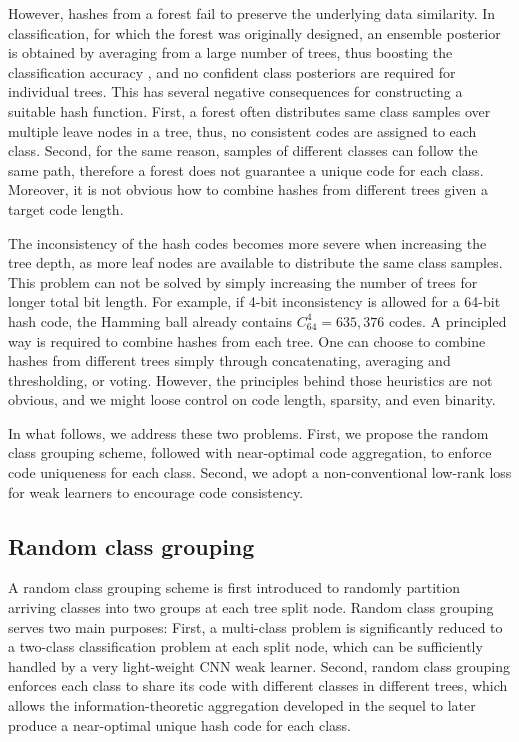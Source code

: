 \documentclass[runningheads]{llncs}
\begin{document}
However, hashes from a forest fail to preserve the underlying data similarity.
In classification, for which the forest was originally designed, an ensemble
posterior is obtained by averaging from a large number of trees, thus boosting
the classification accuracy \cite{RF2001}, and no confident class posteriors are
required for individual trees. This has several negative consequences for
constructing a suitable hash function. First, a forest often distributes same
class samples over multiple leave nodes in a tree, thus, no consistent codes are
assigned to each class. Second, for the same reason, samples of different
classes can follow the same path, therefore a forest does not guarantee a unique
code for each class. Moreover, it is not obvious how to combine hashes from
different trees given a target code length.

The inconsistency of the hash codes becomes more severe when increasing the tree
depth, as more leaf nodes are available to distribute the same class
samples. This problem can not be solved by simply increasing the number of trees
for longer total bit length. For example, if 4-bit inconsistency is allowed for
a 64-bit hash code, the Hamming ball already contains $ C_{64}^4= 635,376$
codes.  A principled way is required to combine hashes from each tree. One can
choose to combine hashes from different trees simply through concatenating,
averaging and thresholding, or voting. However, the principles behind those
heuristics are not obvious, and we might loose control on code length, sparsity,
and even binarity.

In what follows, we address these two problems. First, we propose the random class
grouping scheme, followed with near-optimal code aggregation, to enforce code
uniqueness for each class. Second, we adopt a non-conventional low-rank loss for
weak learners to encourage code consistency.


\subsection{Random class grouping} \label{sec:grouping}
A random class grouping scheme is first introduced to randomly partition
arriving classes into two groups at each tree split node. Random class grouping
serves two main purposes: First, a multi-class problem is significantly reduced
to a two-class classification problem at each split node, which can be
sufficiently handled by a very light-weight CNN weak learner.  Second, random class
grouping enforces each class to share its code with different classes in different
trees, which allows the information-theoretic aggregation developed in the
sequel to later produce a near-optimal unique hash code for each class.
\end{document}
